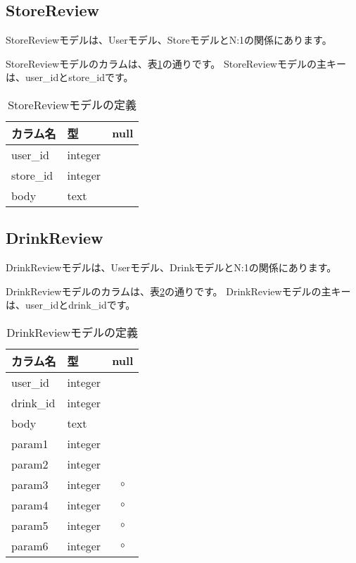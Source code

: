\documentclass[a4j,titlepage]{jarticle}
\begin{document}
\subsection{StoreReview}
StoreReviewモデルは、Userモデル、StoreモデルとN:1の関係にあります。

StoreReviewモデルのカラムは、表\ref{store_review}の通りです。
StoreReviewモデルの主キーは、user\_idとstore\_idです。

\begin{table}[!htbp]
\caption{StoreReviewモデルの定義}
\label{store_review}
\small
\begin{center}
\begin{tabular}{|l|l|c|}\hline
カラム名 & 型 & null \\\hline\hline
user\_id & integer & \\\hline
store\_id & integer & \\\hline
body & text & \\\hline
\end{tabular}
\end{center}
\end{table}

\subsection{DrinkReview}
DrinkReviewモデルは、Userモデル、DrinkモデルとN:1の関係にあります。

DrinkReviewモデルのカラムは、表\ref{drink_review}の通りです。
DrinkReviewモデルの主キーは、user\_idとdrink\_idです。

\begin{table}[!htbp]
\caption{DrinkReviewモデルの定義}
\label{drink_review}
\small
\begin{center}
\begin{tabular}{|l|l|c|}\hline
カラム名 & 型 & null \\\hline\hline
user\_id & integer & \\\hline
drink\_id & integer & \\\hline
body & text & \\\hline
param1 & integer & \\\hline
param2 & integer & \\\hline
param3 & integer & $\circ$ \\\hline
param4 & integer & $\circ$ \\\hline
param5 & integer & $\circ$ \\\hline
param6 & integer & $\circ$ \\\hline
\end{tabular}
\end{center}
\end{table}
\end{document}
